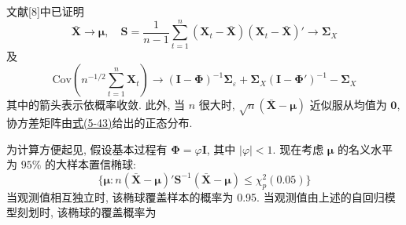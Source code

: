 文献[8]中已证明
\[
\bar{\mathbf{X}}\to\boldsymbol{\mu}, \quad
\mathbf{S}=\frac{1}{n-1}\sum_{t=1}^{n}(\mathbf{X}_t-\bar{\mathbf{X}})(\mathbf{X}_t-\bar{\mathbf{X}})'\to\boldsymbol{\Sigma}_X
\]
及
\label{eq:5-43}
\begin{equation}
\mathrm{Cov}\left(n^{-1/2}\sum_{t=1}^{n}\mathbf{X}_t\right)
\to(\mathbf{I}-\boldsymbol{\Phi})^{-1}\boldsymbol{\Sigma}_{\varepsilon}
+\boldsymbol{\Sigma}_X(\mathbf{I}-\boldsymbol{\Phi}')^{-1}-\boldsymbol{\Sigma}_X \tag{5-43}
\end{equation}
其中的箭头表示依概率收敛. 此外, 当 $n$ 很大时, $\sqrt{n}(\bar{\mathbf{X}}-\boldsymbol{\mu})$ 近似服从均值为 $\mathbf{0}$, 协方差矩阵由\hyperref[eq:5-43]{式(5-43)}给出的正态分布.

为计算方便起见, 假设基本过程有 $\boldsymbol{\Phi}=\varphi\mathbf{I}$, 其中 $|\varphi|<1$. 现在考虑 $\boldsymbol{\mu}$ 的名义水平为 $95\%$ 的大样本置信椭球:
\[
\{\boldsymbol{\mu}: n(\bar{\mathbf{X}}-\boldsymbol{\mu})'\mathbf{S}^{-1}(\bar{\mathbf{X}}-\boldsymbol{\mu})\le\chi_p^2(0.05)\}
\]
当观测值相互独立时, 该椭球覆盖样本的概率为 0.95. 当观测值由上述的自回归模型刻划时, 该椭球的覆盖概率为
